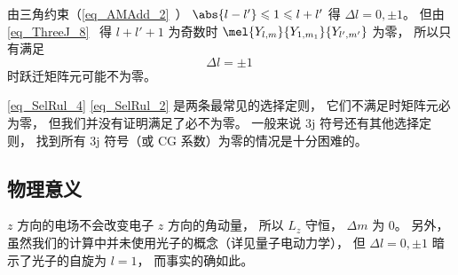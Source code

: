 由三角约束（\autoref{eq_AMAdd_2}~） $\abs{l-l'} \leqslant 1 \leqslant l + l'$ 得 $\Delta l = 0, \pm 1$。 但由\autoref{eq_ThreeJ_8}~ 得 $l + l' + 1$ 为奇数时 $\mel{Y_{l,m}}{Y_{1,m_1}}{Y_{l',m'}}$ 为零， 所以只有满足
\begin{equation}\label{eq_SelRul_2}
 \Delta l = \pm 1~
\end{equation}
时跃迁矩阵元可能不为零。

\autoref{eq_SelRul_4} \autoref{eq_SelRul_2} 是两条最常见的选择定则， 它们不满足时矩阵元必为零， 但我们并没有证明满足了必不为零。 一般来说 3j 符号还有其他选择定则， 找到所有 3j 符号（或 CG 系数）为零的情况是十分困难的。

\subsection{物理意义}
$z$ 方向的电场不会改变电子 $z$ 方向的角动量， 所以 $L_z$ 守恒， $\Delta m$ 为 0。 另外， 虽然我们的计算中并未使用光子的概念（详见量子电动力学）， 但 $\Delta l = 0, \pm 1$ 暗示了光子的自旋为 $l=1$， 而事实的确如此。
